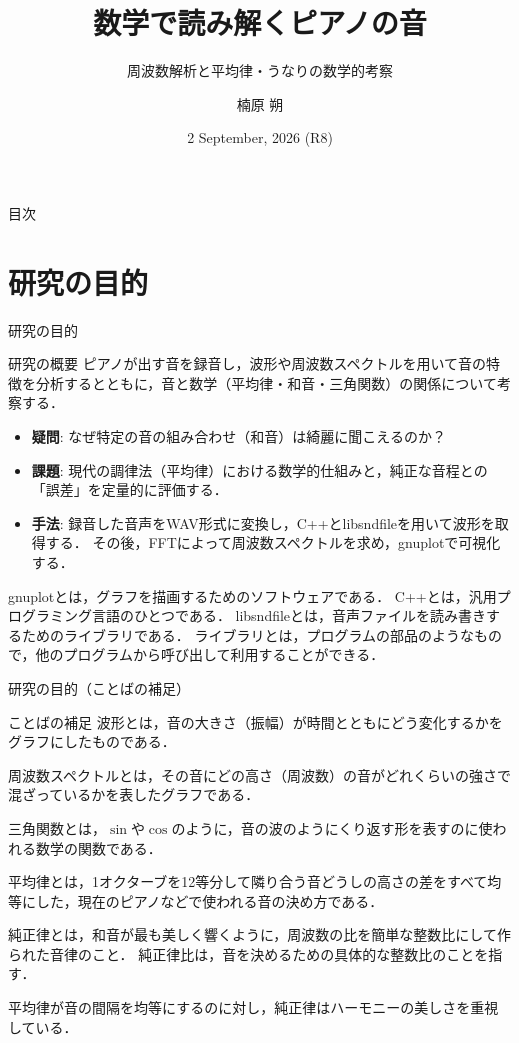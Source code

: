 \documentclass[dvipdfmx,uplatex]{beamer}
\title[数学で読み解くピアノの音]{数学で読み解くピアノの音}
\subtitle{周波数解析と平均律・うなりの数学的考察}
\author{楠原 朔}
\date{2 September, 2026 (R8)}
\begin{document}
\begin{frame}
    \maketitle
\end{frame}

\begin{frame}{目次}
    \tableofcontents
\end{frame}

\section{研究の目的}

\begin{frame}{研究の目的}
  \begin{block}{研究の概要}
    ピアノが出す音を録音し，波形や周波数スペクトルを用いて音の特徴を分析するとともに，音と数学（平均律・和音・三角関数）の関係について考察する．
  \end{block}

  \begin{itemize}
    \item \textbf{疑問}: なぜ特定の音の組み合わせ（和音）は綺麗に聞こえるのか？
    \item \textbf{課題}: 現代の調律法（平均律）における数学的仕組みと，純正な音程との「誤差」を定量的に評価する．
    \item \textbf{手法}: 録音した音声をWAV形式に変換し，C++とlibsndfileを用いて波形を取得する．
          その後，FFTによって周波数スペクトルを求め，gnuplotで可視化する．
  \end{itemize}
  gnuplotとは，グラフを描画するためのソフトウェアである．
  C++とは，汎用プログラミング言語のひとつである．
  libsndfileとは，音声ファイルを読み書きするためのライブラリである．
  ライブラリとは，プログラムの部品のようなもので，他のプログラムから呼び出して利用することができる．
\end{frame}

\begin{frame}{研究の目的（ことばの補足）}
  \begin{block}{ことばの補足}
    波形とは，音の大きさ（振幅）が時間とともにどう変化するかをグラフにしたものである．

    周波数スペクトルとは，その音にどの高さ（周波数）の音がどれくらいの強さで混ざっているかを表したグラフである．

    三角関数とは，$\sin$や$\cos$のように，音の波のようにくり返す形を表すのに使われる数学の関数である．

    平均律とは，1オクターブを12等分して隣り合う音どうしの高さの差をすべて均等にした，現在のピアノなどで使われる音の決め方である．

    純正律とは，和音が最も美しく響くように，周波数の比を簡単な整数比にして作られた音律のこと．
    純正律比は，音を決めるための具体的な整数比のことを指す．

    平均律が音の間隔を均等にするのに対し，純正律はハーモニーの美しさを重視している．
  \end{block}
\end{frame}
\end{document}
